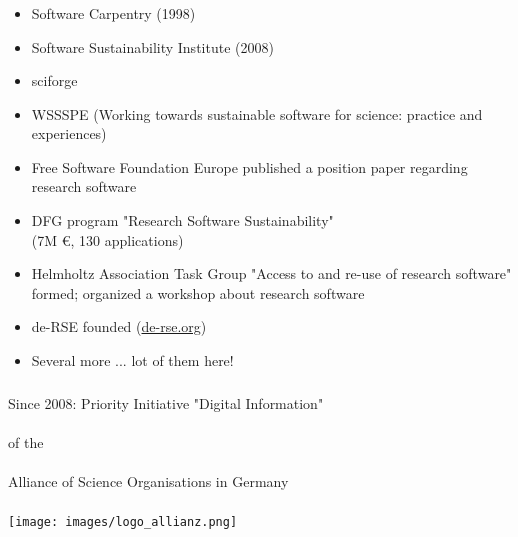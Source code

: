 \documentclass{beamer}
\begin{document}
\begin{frame}
  \frametitle{}
  \begin{block}{}
    {\normalsize
      \begin{itemize}
      \item Software Carpentry (1998)\pause
      \item Software Sustainability Institute (2008)\pause
      \item sciforge\pause
      \item WSSSPE (Working towards sustainable software for science:
        practice and experiences)\pause
      \item Free Software Foundation Europe published a position paper
        regarding research software\pause
      \item DFG program "Research Software Sustainability"\\
        (7M €, 130 applications)\pause
      \item Helmholtz Association Task Group "Access to and re-use of
        research software" formed; organized a workshop about
        research software\pause
      \item de-RSE founded (\href{http://de-rse.org}{de-rse.org})\pause
      \item Several more ... lot of them here!
    \end{itemize}
    }
  \end{block}
\end{frame}

\begin{frame}
  \frametitle{}
  \begin{center}
    Since 2008: Priority Initiative "Digital Information"\\  \ \\
    of the\\ \ \\
    Alliance of Science Organisations in Germany\\
    \ \\
    \texttt{[image: images/logo\_allianz.png]}\\
    \ \\
  \end{center}
\end{frame}
\end{document}
